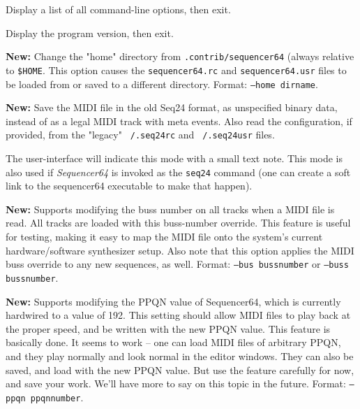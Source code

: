       Display a list of all command-line options, then exit.

      Display the program version, then exit.

      \textbf{New:}
      Change the "home" directory from \texttt{.contrib/sequencer64}
      (always relative to \texttt{\$HOME}.
      This option causes the \texttt{sequencer64.rc}
      and \texttt{sequencer64.usr} files to be loaded from or
      saved to a different directory.
      Format: \texttt{--home dirname}.

      \textbf{New:}
      Save the MIDI file in the old Seq24 format, as unspecified
      binary data, instead of as a legal MIDI track with meta events.
      Also read the configuration, if provided, from the "legacy"
      \texttt{~/.seq24rc} and \texttt{~/.seq24usr} files.


      The user-interface will indicate this mode with a small text
      note.
      This mode is also used if \textsl{Sequencer64} is invoked as the
      \texttt{seq24} command (one can create a soft link to the sequencer64
      executable to make that happen).

      \textbf{New:}
      Supports modifying the buss number on all tracks when a MIDI file is
      read.  All tracks are loaded with this buss-number override.  This
      feature is useful for testing, making it easy to map the MIDI file onto
      the system's current hardware/software synthesizer setup.
      Also note that this option applies the MIDI buss override to any new
      sequences, as well.
      Format: \texttt{--bus bussnumber} or
      \texttt{--buss bussnumber}.

      \textbf{New:}
      Supports modifying the PPQN value of Sequencer64, which is currently
      hardwired to a value of 192.  This setting should allow MIDI files to
      play back at the proper speed, and be written with the new PPQN value.
      This feature is basically done.
      It seems to work -- one can load MIDI files of arbitrary PPQN, and they
      play normally and look normal in the editor windows.  They can also be
      saved, and load with the new PPQN value. 
      But use the feature carefully for now, and save your work.
      We'll have more to say on this topic in the future.
      Format: \texttt{--ppqn ppqnnumber}.


